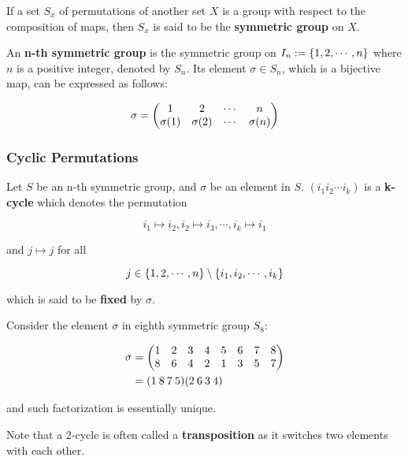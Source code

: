 \documentclass[a4paper,12pt]{article}
\begin{document}
\begin{dft}
  If a set $S_{x}$ of permutations of another set $X$ is a group with respect to the composition of maps, then $S_{x}$ is said to be the \textbf{symmetric group} on $X$.\n

  An \textbf{n-th symmetric group} is the symmetric group on $I_{n}:=\left\{ 1,2,\cdots,n\right\}$ where $n$ is a positive integer, denoted by $S_{n}$. Its element $\sigma\in S_{n}$, which is a bijective map, can be expressed as follows:

  $$\sigma=\left( \begin{matrix}
    1 & 2 & \cdots & n\\
    \sigma(1) & \sigma(2) & \cdots & \sigma(n)
  \end{matrix}\right)$$
\end{dft}

\subsubsection{Cyclic Permutations}
\begin{dft}
  Let $S$ be an n-th symmetric group, and $\sigma$ be an element in $S$. $(i_{1}i_{2}\cdots i_{k})$ is a \textbf{k-cycle} which denotes the permutation

  $$i_{1}\mapsto i_{2},i_{2}\mapsto i_{3},\cdots,i_{k}\mapsto i_{1}$$\s

  and $j\mapsto j$ for all

  $$j\in\left\{ 1,2,\cdots,n\right\}\setminus\left\{ i_{1},i_{2},\cdots,i_{k}\right\}$$\s

  which is said to be \textbf{fixed} by $\sigma$.
\end{dft}\n

\begin{exm}
  Consider the element $\sigma$ in eighth symmetric group $S_{8}$:

  $$\begin{aligned}[t]
    \sigma&=\left( \begin{matrix}
      1 & 2 & 3 & 4 & 5 & 6 & 7 & 8\\
      8 & 6 & 4 & 2 & 1 & 3 & 5 & 7
    \end{matrix}\right)\\
    &=(1\: 8\: 7\: 5)(2\: 6\: 3\: 4)
  \end{aligned}$$\s

  and such factorization is essentially unique.
\end{exm}\n

Note that a 2-cycle is often called a \textbf{transposition} as it switches two elements with each other.\n
\end{document}
